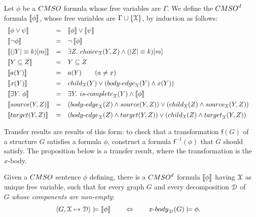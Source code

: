 \begin{definition}\label{def:transfer}  Let $\phi$ be a $\CMSO$ formula whose free variables are $\Gamma$. 
 We define the $\CMSOd$ formula $\left\llbracket {\phi}\right\rrbracket$, whose free variables are $\Gamma\cup\left\{\mathcal X\right\}$,  by induction as follows:
 $$\begin{array}{lll}
    \tms{\phi\vee \psi}&= & \tms{\phi} \vee \tms{\psi} \\[4pt]
    \tms{\neg \phi}&= & \neg \tms{\phi}\\[4pt]
      \tms{(|Y|\equiv k)[m]}&= & \exists Z.\ \mathsf{choice}_\cX(Y,Z)\wedge (|Z|\equiv k)[m]\\[4pt]
   \tms{Y\subseteq Z}&= & Y\subseteq Z \\[4pt]
     \tms{a(Y)}&= & a(Y)\qquad (a\neq x) \\[4pt]
       \tms{x(Y)}&= & \mathsf{child}_\cX(Y) \vee (\mathsf{body\text{-}edge}_\cX(Y)\wedge x(Y) ) \\[4pt]
        \tms{\exists Y.\ \phi}&= &\exists Y.\ \mathsf{is\text{-}complete}_\cX(Y)\wedge \tms{\phi}\\[4pt]
 \tms{\mathsf{source}(Y,Z)}& =&(\mathsf{body\text{-}edge}_\cX(Z)\wedge \mathsf{source}(Y,Z) )\vee (\mathsf{child}_\cX(Z)\wedge \mathsf{source}_\cX(Y,Z) )\\[4pt]
 \tms{\mathsf{target}(Y,Z)}&= &(\mathsf{body\text{-}edge}_\cX(Z)\wedge \mathsf{target}(Y,Z) )\vee (\mathsf{child}_\cX(Z)\wedge \mathsf{target}_\cX(Y,Z) )
 \end{array}
 $$
 \end{definition}

Transfer results are results of this form: to check that a transformation $\mathsf{f}(G)$ of a structure $G$ satisfies a formula $\phi$, construct a formula $\mathsf{f}^{-1}(\phi)$ that $G$ should satisfy. The proposition below is a transfer result, where the transformation is the $x$-body.

 \begin{proposition}\label{prop:transfer}
Given a $\CMSO$ sentence $\phi$ defining, there is a $\CMSOd$ formula $\left\llbracket {\phi}\right\rrbracket$ having $\mathcal X$ as unique free variable, such that for every graph $G$ and every decomposition $\mathcal D$  of $G$ \emph{whose components are non-empty}:
$$\langle G,\cX\mapsto\cD\rangle \models\tms{\phi}\qquad \Leftrightarrow \qquad  \text{$x$-}\mathsf{body}_\cD(G)\models \phi.$$
\end{proposition}




